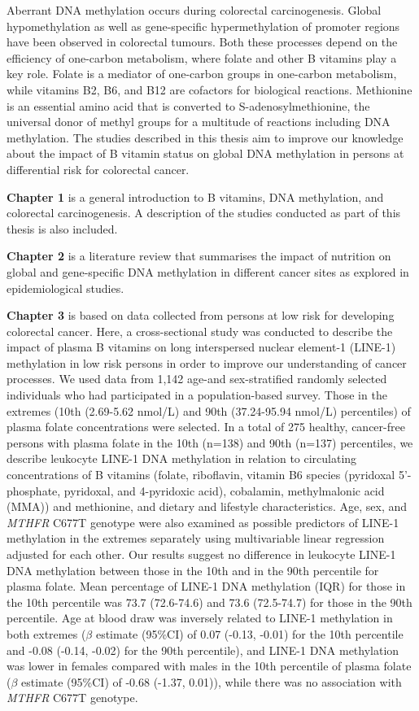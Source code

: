 \noindent Aberrant DNA methylation occurs during colorectal carcinogenesis. Global hypomethylation as well as gene-specific hypermethylation of promoter regions have been observed in colorectal tumours. Both these processes depend on the efficiency of one-carbon metabolism, where folate and other B vitamins play a key role. Folate is a mediator of one-carbon groups in one-carbon metabolism, while vitamins B2, B6, and B12 are cofactors for biological reactions. Methionine is an essential amino acid that is converted to S-adenosylmethionine, the universal donor of methyl groups for a multitude of reactions including DNA methylation. The studies described in this thesis aim to improve our knowledge about the impact of B vitamin status on global DNA methylation in persons at differential risk for colorectal cancer.

\noindent \textbf{Chapter 1} is a general introduction to B vitamins, DNA methylation, and colorectal carcinogenesis. A description of the studies conducted as part of this thesis is also included.

\noindent \textbf{Chapter 2} is a literature review that summarises the impact of nutrition on global and gene-specific DNA methylation in different cancer sites as explored in epidemiological studies.

\noindent \textbf{Chapter 3} is based on data  collected from persons at low risk for developing colorectal cancer. Here, a cross-sectional study was conducted to describe the impact of plasma B vitamins on long interspersed nuclear element-1 (LINE-1) methylation in low risk persons in order to improve our understanding of cancer processes. We used data from 1,142 age-and sex-stratified randomly selected individuals who had participated in a population-based survey. Those in the extremes (10th (2.69-5.62 nmol/L) and 90th (37.24-95.94 nmol/L) percentiles) of plasma folate concentrations were selected. In a total of 275 healthy, cancer-free persons with plasma folate in the 10th (n=138) and 90th (n=137) percentiles, we describe leukocyte LINE-1 DNA methylation in relation to circulating concentrations of B vitamins (folate, riboflavin, vitamin B6 species (pyridoxal 5'-phosphate, pyridoxal, and 4-pyridoxic acid), cobalamin, methylmalonic acid (MMA)) and methionine, and dietary and lifestyle characteristics. Age, sex, and \emph{MTHFR} C677T genotype were also examined as possible predictors of LINE-1 methylation in the extremes separately using multivariable linear regression adjusted for each other. Our results suggest no difference in leukocyte LINE-1 DNA methylation between those in the 10th and in the 90th percentile for plasma folate. Mean percentage of LINE-1 DNA methylation (IQR) for those in the 10th percentile was 73.7 (72.6-74.6) and 73.6 (72.5-74.7) for those in the 90th percentile. Age at blood draw was inversely related to LINE-1 methylation in both extremes ($\beta$ estimate (95\%CI) of 0.07 (-0.13, -0.01) for the 10th percentile and -0.08 (-0.14, -0.02) for the 90th percentile), and LINE-1 DNA methylation was lower in females compared with males in the 10th percentile of plasma folate ($\beta$ estimate (95\%CI) of -0.68 (-1.37, 0.01)), while there was no association with \emph{MTHFR} C677T genotype.

